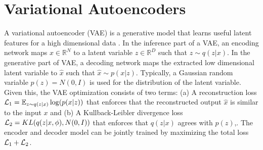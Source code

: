 \documentclass{article}
\def\R{\mathbb{R}}
\def\L{{\cal L}}
\def\L{{\cal L}}
\def\R{{\mathbb R}}
\def\E{{\mathbb E}}
\begin{document}

\section{Variational Autoencoders }

A variational autoencoder (VAE) is a generative model that learns useful latent features for a high dimensional data \cite{kingma2014auto}. In the inference part of a VAE, an encoding network maps $x \in \R^N $ to a latent variable  $z\in \R^{D}$ such that $z \sim q(z|x)$. In the generative part of VAE, a decoding network maps the extracted low dimensional latent variable to $\hat{x}$ such that $\hat{x}\sim p(x|z)$. Typically, a Gaussian random variable $p(z)=N(0,I)$ is used for the distribution of the latent variable. Given this, the VAE optimization consists of two terms: (a) A reconstruction loss $\L_1=  \E_{z \sim q(z|x)} \log(p(x|z))$ that enforces that the reconstructed output $\hat{x}$ is similar to the input $x$ and (b) A Kullback-Leibler divergence loss $\L_2 =  KL(q(z|x,\phi),N(0,I))$   that enforces that $q(z|x)$ agrees with $p(z)$,. The encoder and decoder model can be jointly trained by maximizing the total loss $\L_1+\L_2$. 
\end{document}

